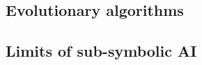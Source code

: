 \subsection{Evolutionary algorithms}\label{subsec:evolutionary-algorithms}

\subsection{}\label{subsec:svm}

\subsection{}\label{subsec:neural-networks}

\subsection{Limits of sub-symbolic \Gls{AI}}\label{subsec:limits-of-sub-symbolic-ai}